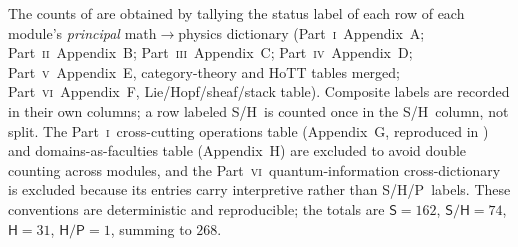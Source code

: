 \documentclass[12pt]{article}
\theoremstyle{definition}
\theoremstyle{remark}
\newcommand{\Sstat}{\textsf{S}}
\newcommand{\Hstat}{\textsf{H}}
\newcommand{\Pstat}{\textsf{P}}
\newcommand{\PI}{\textsc{i}}
\newcommand{\PII}{\textsc{ii}}
\newcommand{\PIII}{\textsc{iii}}
\newcommand{\PIV}{\textsc{iv}}
\newcommand{\PV}{\textsc{v}}
\newcommand{\PVI}{\textsc{vi}}
\begin{document}
The counts of  are obtained by tallying the status label of each row
of each module's \emph{principal} math$\to$physics dictionary (Part~\PI\ Appendix~A;
Part~\PII\ Appendix~B; Part~\PIII\ Appendix~C; Part~\PIV\ Appendix~D; Part~\PV\
Appendix~E, category-theory and HoTT tables merged; Part~\PVI\ Appendix~F,
Lie/Hopf/sheaf/stack table).  Composite labels are recorded in their own columns; a row
labeled \Sstat/\Hstat\ is counted once in the \Sstat/\Hstat\ column, not split.  The
Part~\PI\ cross-cutting operations table (Appendix~G, reproduced in \Cref{app:ops}) and
domains-as-faculties table (Appendix~H) are excluded to avoid double counting across
modules, and the Part~\PVI\ quantum-information cross-dictionary is excluded because its
entries carry interpretive rather than \Sstat/\Hstat/\Pstat\ labels.  These conventions
are deterministic and reproducible; the totals are $\Sstat=162$, $\Sstat/\Hstat=74$,
$\Hstat=31$, $\Hstat/\Pstat=1$, summing to $268$.
\end{document}
